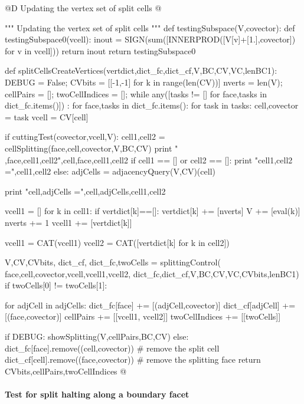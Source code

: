 \documentclass[11pt,oneside]{article}	%
\begin{document}
@D Updating the vertex set  of split cells
@{""" Updating the vertex set of split cells """
def testingSubspace(V,covector):
	def testingSubspace0(vcell):
		inout = SIGN(sum([INNERPROD([V[v]+[1.],covector]) for v in vcell]))
		return inout
	return testingSubspace0

def splitCellsCreateVertices(vertdict,dict_fc,dict_cf,V,BC,CV,VC,lenBC1):
	DEBUG = False; CVbits = [[-1,-1] for k in range(len(CV))] 
	nverts = len(V); cellPairs = []; twoCellIndices = []; 
	while any([tasks != [] for face,tasks in dict_fc.items()]) : 
		for face,tasks in dict_fc.items():
			for task in tasks:
				cell,covector = task
				vcell = CV[cell]

				if cuttingTest(covector,vcell,V):
					cell1,cell2 = cellSplitting(face,cell,covector,V,BC,CV)
					print " \ncell,face,cell1,cell2",cell,face,cell1,cell2
					if cell1 == [] or cell2 == []:
						print "cell1,cell2 =",cell1,cell2
					else:
						adjCells = adjacencyQuery(V,CV)(cell)
						
						print "cell,adjCells =",cell,adjCells,cell1,cell2
						
						vcell1 = []
						for k in cell1:
							if vertdict[k]==[]: 
								vertdict[k] += [nverts]
								V += [eval(k)]
								nverts += 1
							vcell1 += [vertdict[k]]
						
						vcell1 = CAT(vcell1)
						vcell2 = CAT([vertdict[k] for k in cell2])							
															
						V,CV,CVbits, dict_cf, dict_fc,twoCells = splittingControl(
							face,cell,covector,vcell,vcell1,vcell2, dict_fc,dict_cf,V,BC,CV,VC,CVbits,lenBC1)
						if twoCells[0] != twoCells[1]:

							for adjCell in adjCells:
								dict_fc[face] += [(adjCell,covector)] 
								dict_cf[adjCell] += [(face,covector)] 
								cellPairs += [[vcell1, vcell2]]
								twoCellIndices += [[twoCells]]
												
					if DEBUG: showSplitting(V,cellPairs,BC,CV)
				else:
					dict_fc[face].remove((cell,covector))   # remove the split cell
					dict_cf[cell].remove((face,covector))   # remove the splitting face
	return CVbits,cellPairs,twoCellIndices
@}


\paragraph{Test for split halting along a boundary facet}
\end{document}
